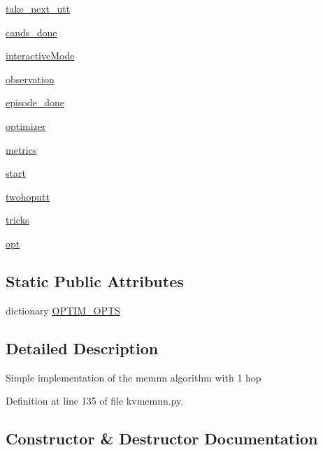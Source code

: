 \begin{DoxyCompactItemize}
\hyperlink{classkvmemnn_1_1KvmemnnAgent_a9255f528569962cccc89c575e99b414a}{take\+\_\+next\+\_\+utt}
\item 
\hyperlink{classkvmemnn_1_1KvmemnnAgent_a175207a4d4e589e68d8a81e4d1390925}{cands\+\_\+done}
\item 
\hyperlink{classkvmemnn_1_1KvmemnnAgent_aa5d6db7229e8767b9a41e85d17f4680e}{interactive\+Mode}
\item 
\hyperlink{classkvmemnn_1_1KvmemnnAgent_a35de1b119d32bdc99bedbae205fd1555}{observation}
\item 
\hyperlink{classkvmemnn_1_1KvmemnnAgent_a0019d193f96811c4968694326b11e98e}{episode\+\_\+done}
\item 
\hyperlink{classkvmemnn_1_1KvmemnnAgent_a2f5075b4d8503fe1fd0a230be9233a12}{optimizer}
\item 
\hyperlink{classkvmemnn_1_1KvmemnnAgent_ac8fb83cab866022a264be22fca627193}{metrics}
\item 
\hyperlink{classkvmemnn_1_1KvmemnnAgent_a289b7cc75e8218d634de60309dce5dc0}{start}
\item 
\hyperlink{classkvmemnn_1_1KvmemnnAgent_a425dd495d980f380518376a470b35e46}{twohoputt}
\item 
\hyperlink{classkvmemnn_1_1KvmemnnAgent_a990b47005f133ea823d46ab78baea437}{tricks}
\item 
\hyperlink{classkvmemnn_1_1KvmemnnAgent_ab562f6f2d7ad624a9c76c59df5efcb6d}{opt}
\end{DoxyCompactItemize}
\subsection*{Static Public Attributes}
\begin{DoxyCompactItemize}
\item 
dictionary \hyperlink{classkvmemnn_1_1KvmemnnAgent_a807ca275e7f9ba1135bd35fd92831dff}{O\+P\+T\+I\+M\+\_\+\+O\+P\+TS}
\end{DoxyCompactItemize}


\subsection{Detailed Description}
\begin{DoxyVerb}Simple implementation of the memnn algorithm with 1 hop
\end{DoxyVerb}
 

Definition at line 135 of file kvmemnn.\+py.



\subsection{Constructor \& Destructor Documentation}
\mbox{\label{classkvmemnn_1_1KvmemnnAgent_a7a510bb5ac2444d5a30715c77bf55684}} 
